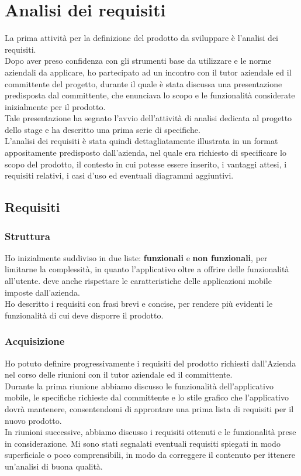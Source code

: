 \newpage
\chapter{Analisi dei requisiti}
\label{cap:analisi-requisiti}
La prima attività per la definizione del prodotto da sviluppare è l'analisi dei requisiti.
\\
Dopo aver preso confidenza con gli strumenti base da utilizzare e le norme aziendali da applicare, ho partecipato ad un incontro con il tutor aziendale ed il committente del progetto, durante il quale è stata discussa una presentazione predisposta dal committente, che enunciava lo scopo e le funzionalità considerate inizialmente per il prodotto.
\\
Tale presentazione ha segnato l'avvio dell'attività di analisi dedicata al progetto dello stage e ha descritto una prima serie di specifiche.
\\
L'analisi dei requisiti è stata quindi dettagliatamente illustrata in un format appositamente predisposto dall'azienda, nel quale era richiesto di specificare lo scopo del prodotto, il contesto in cui potesse essere inserito, i vantaggi attesi, i requisiti relativi, i casi d'uso ed eventuali diagrammi aggiuntivi.
\section{Requisiti}
\subsection{Struttura}
Ho inizialmente suddiviso in due liste: \textbf{funzionali} e \textbf{non funzionali}, per limitarne la complessità, in quanto l'applicativo oltre a offrire delle funzionalità all'utente. deve anche rispettare le caratteristiche delle applicazioni mobile imposte dall'azienda.
\\
Ho descritto i requisiti con frasi brevi e concise, per rendere più evidenti le funzionalità di cui deve disporre il prodotto.
\\

\subsection{Acquisizione}
Ho potuto definire progressivamente i requisiti del prodotto richiesti dall'Azienda nel corso delle riunioni con il tutor aziendale ed il committente. \\
Durante la prima riunione abbiamo discusso le funzionalità dell'applicativo mobile, le specifiche richieste dal committente e lo stile grafico che l'applicativo dovrà mantenere, consentendomi di approntare una prima lista di requisiti per il nuovo prodotto. \\
In riunioni successive, abbiamo discusso i requisiti ottenuti e le funzionalità prese in considerazione. Mi sono stati segnalati eventuali requisiti spiegati in modo superficiale o poco comprensibili, in modo da correggere il contenuto per ittenere un'analisi di buona qualità.
